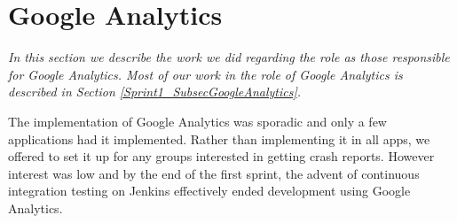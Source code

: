 \section{Google Analytics} \label{Roles_SecAnalytics}
\textit{In this section we describe  the work we did regarding the role as those responsible for Google Analytics. Most of our work in the role of Google Analytics is described in Section \ref{Sprint1_SubsecGoogleAnalytics}.}

The implementation of Google Analytics was sporadic and only a few applications had it implemented. Rather than implementing it in all apps, we offered to set it up for any groups interested in getting crash reports. However interest was low and by the end of the first sprint, the advent of continuous integration testing on Jenkins effectively ended development using Google Analytics.
